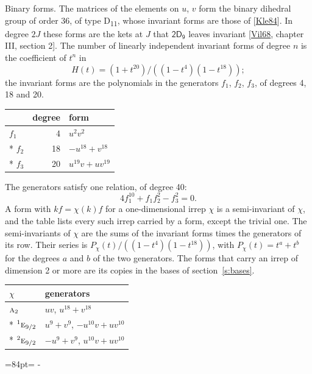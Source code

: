 \documentclass[10pt,a4paper]{article}
\makeatletter
\renewcommand\paragraph{\@startsection{paragraph}{4}{\z@}{1.5ex plus .5ex minus .2ex}{-1em}%
  {\normalfont\small\sffamily\bfseries\color{parttitle}}}
\newcommand{\needspace}[1]{\par\penalty-100\begingroup\dimen0=#1\relax\dimen2=\pagegoal
  \advance\dimen2-\pagetotal\ifdim\dimen0>\dimen2\relax\ifdim\dimen2>0pt\vfil\break\fi\fi
  \endgroup}
\numberwithin{equation}{section}
\newcommand{\grp}[1]{\mathsf{#1}}
\newcommand{\irr}[1]{\text{\normalfont\scshape #1}}
\newcommand{\conjpair}[1]{{}^{#1}}
\makeatother
\begin{document}
\paragraph{Binary forms.}
The matrices of the elements on $u$, $v$ form the binary dihedral group of order 36, of type D\textsubscript{11}, whose invariant forms are those of [\href{../../../REFERENCES.pdf\#ref.Kle84}{Kle84}]. In degree $2J$ these forms are the kets at $J$ that $\grp{2D_{9}}$ leaves invariant [\href{../../../REFERENCES.pdf\#ref.Vil68}{Vil68}, chapter III, section 2]. \label{n:head.degree}\label{n:head.form}The number of linearly independent invariant forms of degree $n$ is the coefficient of $t^n$ in
\begin{equation}\label{e:molien}H(t) = (1 + t^{20})/((1-t^{4})(1-t^{18}));\end{equation}
the invariant forms are the polynomials in the generators $f_1$, $f_2$, $f_3$, of degrees 4, 18 and 20.
{\small\begin{longtable}{@{}lrl@{}}\toprule
& degree & form\\\midrule\endhead
\bottomrule\endfoot\endlastfoot
$f_{1}$ & 4 & $u^{2}v^{2}$\\*
$f_{2}$ & 18 & $-u^{18} + v^{18}$\\*
$f_{3}$ & 20 & $u^{19}v + uv^{19}$\\
\bottomrule\end{longtable}}
The generators satisfy one relation, of degree 40:
\begin{equation}\label{e:relation}4f_{1}^{10} + f_{1}f_{2}^{2} - f_{3}^{2} = 0.\end{equation}
A form with $k f = \chi(k) f$ for a one-dimensional irrep $\chi$ is a semi-invariant of $\chi$, and the table lists every such irrep carried by a form, except the trivial one. \label{n:head.generators}The semi-invariants of $\chi$ are the sums of the invariant forms times the generators of its row. Their series is $P_\chi(t)/((1-t^{4})(1-t^{18}))$, with $P_\chi(t) = t^{a} + t^{b}$ for the degrees $a$ and $b$ of the two generators. The forms that carry an irrep of dimension 2 or more are its copies in the bases of section~\ref{s:bases}.
{\small\begin{longtable}{@{}ll@{}}\toprule
$\chi$ & generators\\\midrule\endhead
\bottomrule\endfoot\endlastfoot
$\irr{a}_{2}$ & $uv$, $u^{18} + v^{18}$\\*
$\conjpair{1}\irr{e}_{9/2}$ & $u^{9} + v^{9}$, $-u^{10}v + uv^{10}$\\*
$\conjpair{2}\irr{e}_{9/2}$ & $-u^{9} + v^{9}$, $u^{10}v + uv^{10}$\\
\bottomrule\end{longtable}}
\needspace{84pt}
\end{document}
